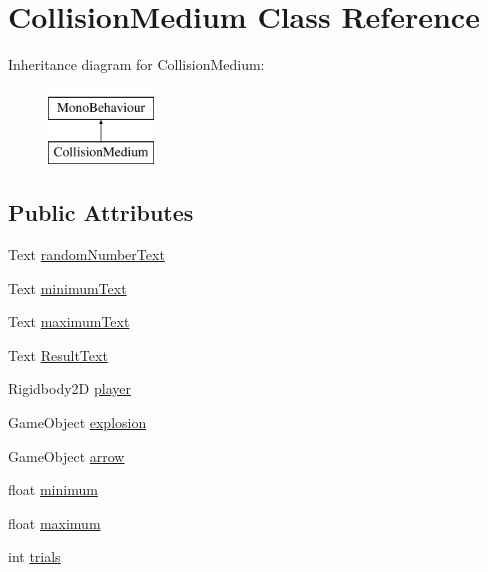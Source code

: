 \hypertarget{classCollisionMedium}{}\section{Collision\+Medium Class Reference}
\label{classCollisionMedium}
Inheritance diagram for Collision\+Medium\+:\begin{figure}[H]
\begin{center}
\leavevmode
\includegraphics[height=2.000000cm]{classCollisionMedium}
\end{center}
\end{figure}
\subsection*{Public Attributes}
\begin{DoxyCompactItemize}
\item 
Text \hyperlink{classCollisionMedium_a0f7e5a5ae17447eacd0dcc8eee0a2152}{random\+Number\+Text}
\item 
Text \hyperlink{classCollisionMedium_ae64295f437f703c4fbee613dc7f27414}{minimum\+Text}
\item 
Text \hyperlink{classCollisionMedium_a27e6d89fe01db8c9f1695322f500841c}{maximum\+Text}
\item 
Text \hyperlink{classCollisionMedium_a28a173a96cabaf96fedb2c08a7cd66e7}{Result\+Text}
\item 
Rigidbody2D \hyperlink{classCollisionMedium_a7dc78ec3dd63bf97f6c785df77b55afa}{player}
\item 
Game\+Object \hyperlink{classCollisionMedium_a0d0dccb87c53b398dacb1f87326ec7b3}{explosion}
\item 
Game\+Object \hyperlink{classCollisionMedium_ad4033d32f673d812057144ee995d5809}{arrow}
\item 
float \hyperlink{classCollisionMedium_aad716c2a2f4f0bcea4773c2125a60341}{minimum}
\item 
float \hyperlink{classCollisionMedium_a14b0b1128ccc59b0c0781721977ee6b0}{maximum}
\item 
int \hyperlink{classCollisionMedium_af3c37db011d5aeddd87451762cc18547}{trials}
\end{DoxyCompactItemize}
